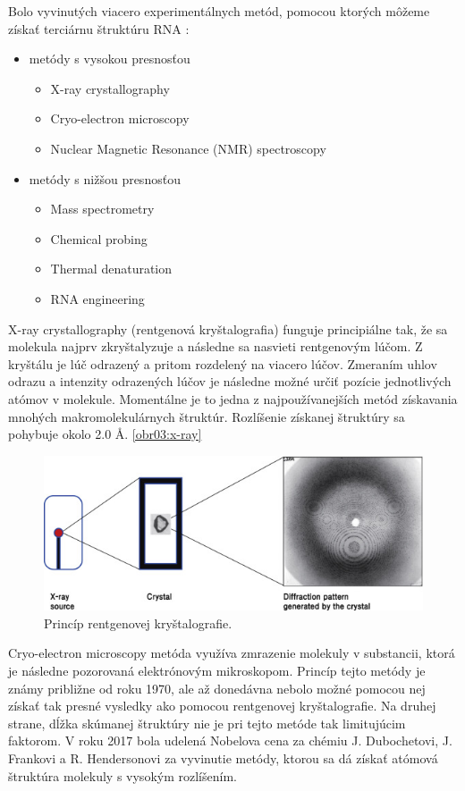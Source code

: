 \indent 
Bolo vyvinutých viacero experimentálnych metód, pomocou ktorých môžeme získať terciárnu štruktúru RNA \cite{Felden07}:
\begin{itemize}
\item metódy s vysokou presnosťou
\begin{itemize}
\item X-ray crystallography
\item Cryo-electron microscopy 
\item Nuclear Magnetic Resonance (NMR) spectroscopy
\end{itemize}
\item metódy s nižšou presnosťou
\begin{itemize}
\item Mass spectrometry
\item Chemical probing
\item Thermal denaturation
\item RNA engineering
\end{itemize}
\end{itemize}


\indent X-ray crystallography (rentgenová kryštalografia) funguje principiálne tak, že sa molekula najprv zkryštalyzuje a následne sa nasvieti rentgenovým lúčom. Z kryštálu je lúč odrazený a pritom rozdelený na viacero lúčov. Zmeraním uhlov odrazu a intenzity odrazených lúčov je následne možné určiť pozície jednotlivých atómov v molekule. Momentálne je to jedna z najpoužívanejších metód získavania mnohých makromolekulárnych štruktúr. Rozlíšenie získanej štruktúry sa pohybuje okolo 2.0 Å. \autoref{obr03:x-ray}


\begin{figure}%
\includegraphics[width=\textwidth]{../img/x-ray}
\caption{Princíp rentgenovej kryštalografie. \cite{Ryu17}}
\label{obr03:x-ray}
\end{figure}


\indent Cryo-electron microscopy metóda využíva zmrazenie molekuly v substancii, ktorá je následne pozorovaná elektrónovým mikroskopom. Princíp tejto metódy je známy približne od roku 1970, ale až donedávna nebolo možné pomocou nej získať tak presné vysledky ako pomocou rentgenovej kryštalografie. Na druhej strane, dĺžka skúmanej štruktúry nie je pri tejto metóde tak limitujúcim faktorom. V roku 2017 bola udelená Nobelova cena za chémiu  J. Dubochetovi, J. Frankovi a  R. Hendersonovi za vyvinutie metódy, ktorou sa dá získať atómová štruktúra molekuly s vysokým rozlíšením.


